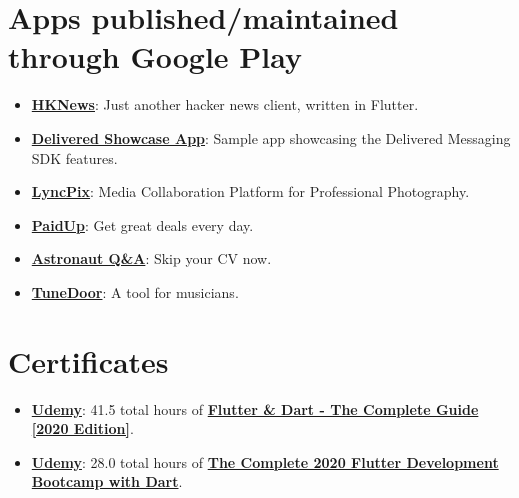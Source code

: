 \documentclass[letterpaper,11pt]{article}
\newcommand{\resumeSubHeadingListStart}{\begin{itemize}[leftmargin=*]}
\newcommand{\resumeSubHeadingListEnd}{\end{itemize}}
\begin{document}
\section{Apps published/maintained through Google Play}
  \resumeSubHeadingListStart
    \item{
        \textbf{\href{https://play.google.com/store/apps/details?id=vifi.services.hknews}{HKNews}}{: Just another hacker news client, written in Flutter.}
    }
    \item{
        \textbf{\href{https://play.google.com/store/apps/details?id=im.delivered.showcase.bobcat}{Delivered Showcase App}}{: Sample app showcasing the Delivered Messaging SDK features.}
    }
    \item{
        \textbf{\href{https://play.google.com/store/apps/developer?id=LyncPix}{LyncPix}}{: Media Collaboration Platform for Professional Photography.}
    }
    \item{
        \textbf{\href{https://play.google.com/store/apps/details?id=ph.paidup}{PaidUp}}{: Get great deals every day.}
    }
    \item{
        \textbf{\href{https://play.google.com/store/apps/details?id=co.astrnt.android}{Astronaut Q\&A}}{: Skip your CV now.}
    }
    \item{
        \textbf{\href{https://play.google.com/store/apps/details?id=com.tunedoorinc.tunedoor}{TuneDoor}}{: A tool for musicians.}
    }
  \resumeSubHeadingListEnd

\section{Certificates}
  \resumeSubHeadingListStart
    \item{
            \textbf{\href{https://www.udemy.com/certificate/UC-4000485f-482e-4c76-bf3d-c19154f4adeb/}{Udemy}}{:  41.5 total hours of \textbf{\href{https://www.udemy.com/certificate/UC-4000485f-482e-4c76-bf3d-c19154f4adeb/}{Flutter \& Dart - The Complete Guide [2020 Edition]}}.}
        }
    \item{
            \textbf{\href{https://www.udemy.com/certificate/UC-4876099e-cc3e-489b-9dd4-7c16a978cd56/}{Udemy}}{:  28.0 total hours of \textbf{\href{https://www.udemy.com/certificate/UC-4876099e-cc3e-489b-9dd4-7c16a978cd56/}{The Complete 2020 Flutter Development Bootcamp with Dart}}.}
        }
  \resumeSubHeadingListEnd
\end{document}
